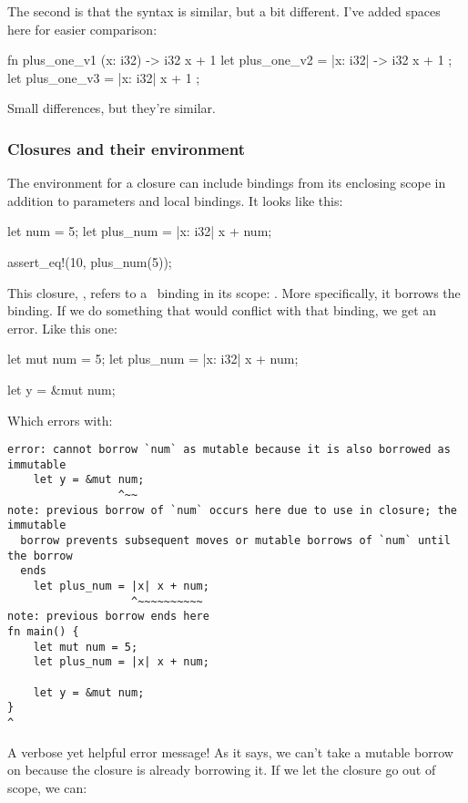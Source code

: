 The second is that the syntax is similar, but a bit different. I've added spaces here for easier comparison:

\begin{rustc}
fn  plus_one_v1   (x: i32) -> i32 { x + 1 }
let plus_one_v2 = |x: i32| -> i32 { x + 1 };
let plus_one_v3 = |x: i32|          x + 1  ;
\end{rustc}

Small differences, but they're similar.

\subsubsection*{Closures and their environment}

The environment for a closure can include bindings from its enclosing scope in addition to parameters and local bindings. It looks like this:

\begin{rustc}
let num = 5;
let plus_num = |x: i32| x + num;

assert_eq!(10, plus_num(5));
\end{rustc}

This closure, , refers to a \keylet\ binding in its scope: . More specifically, it borrows the binding. If we 
do something that would conflict with that binding, we get an error. Like this one:

\begin{rustc}
let mut num = 5;
let plus_num = |x: i32| x + num;

let y = &mut num;
\end{rustc}

Which errors with:

\begin{verbatim}
error: cannot borrow `num` as mutable because it is also borrowed as immutable
    let y = &mut num;
                 ^~~
note: previous borrow of `num` occurs here due to use in closure; the immutable
  borrow prevents subsequent moves or mutable borrows of `num` until the borrow
  ends
    let plus_num = |x| x + num;
                   ^~~~~~~~~~~
note: previous borrow ends here
fn main() {
    let mut num = 5;
    let plus_num = |x| x + num;

    let y = &mut num;
}
^
\end{verbatim}

A verbose yet helpful error message! As it says, we can't take a mutable borrow on  because the closure is already borrowing 
it. If we let the closure go out of scope, we can:

